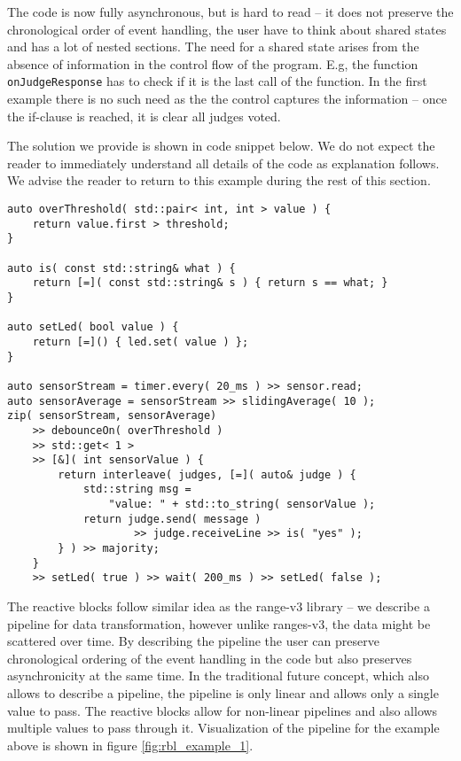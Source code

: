 The code is now fully asynchronous, but is hard to read -- it does not preserve
the chronological order of event handling, the user have to think about shared
states and has a lot of nested sections. The need for a shared state arises from
the absence of information in the control flow of the program. E.g, the function
\texttt{onJudgeResponse} has to check if it is the last call of the function. In
the first example there is no such need as the the control captures the
information -- once the if-clause is reached, it is clear all judges voted.

The solution we provide is shown in code snippet below. We do not expect the
reader to immediately understand all details of the code as explanation
follows. We advise the reader to return to this example during the rest of
this section.

\begin{verbatim}
auto overThreshold( std::pair< int, int > value ) {
    return value.first > threshold;
}

auto is( const std::string& what ) {
    return [=]( const std::string& s ) { return s == what; }
}

auto setLed( bool value ) {
    return [=]() { led.set( value ) };
}

auto sensorStream = timer.every( 20_ms ) >> sensor.read;
auto sensorAverage = sensorStream >> slidingAverage( 10 );
zip( sensorStream, sensorAverage)
    >> debounceOn( overThreshold )
    >> std::get< 1 >
    >> [&]( int sensorValue ) {
        return interleave( judges, [=]( auto& judge ) {
            std::string msg =
                "value: " + std::to_string( sensorValue );
            return judge.send( message )
                    >> judge.receiveLine >> is( "yes" );
        } ) >> majority;
    }
    >> setLed( true ) >> wait( 200_ms ) >> setLed( false );
\end{verbatim}

The reactive blocks follow similar idea as the range-v3 library -- we describe a
pipeline for data transformation, however unlike ranges-v3, the data might be
scattered over time. By describing the pipeline the user can preserve
chronological ordering of the event handling in the code but also preserves
asynchronicity at the same time. In the traditional future concept, which also
allows to describe a pipeline, the pipeline is only linear and allows only a
single value to pass. The reactive blocks allow for non-linear pipelines and
also allows multiple values to pass through it. Visualization of the pipeline
for the example above is shown in figure \ref{fig:rbl_example_1}.


